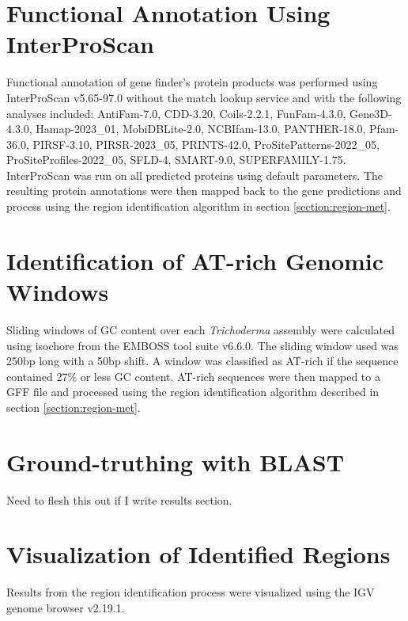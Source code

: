 \section{Functional Annotation Using InterProScan}

Functional annotation of gene finder's protein products was performed
using InterProScan v5.65-97.0\cite{10.1093/bioinformatics/btu031}
without the match lookup service and with the following analyses
included: AntiFam-7.0, CDD-3.20, Coils-2.2.1, FunFam-4.3.0,
Gene3D-4.3.0, Hamap-2023\_01, MobiDBLite-2.0, NCBIfam-13.0,
PANTHER-18.0, Pfam-36.0, PIRSF-3.10, PIRSR-2023\_05, PRINTS-42.0,
ProSitePatterns-2022\_05, ProSiteProfiles-2022\_05, SFLD-4, SMART-9.0,
SUPERFAMILY-1.75. InterProScan was run on all predicted proteins using
default parameters. The resulting protein annotations were then mapped
back to the gene predictions and process using the region
identification algorithm in section \ref{section:region-met}.

\section{Identification of AT-rich Genomic Windows}

Sliding windows of GC content over each \textit{Trichoderma} assembly
were calculated using isochore from the EMBOSS tool suite
v6.6.0\cite{Rice2000}. The sliding window used was 250bp long with a
50bp shift. A window was classified as AT-rich if the sequence
contained 27\% or less GC content. AT-rich sequences were then mapped
to a GFF file and processed using the region identification algorithm
described in section \ref{section:region-met}.

\section{Ground-truthing with BLAST}

Need to flesh this out if I write results section.

\section{Visualization of Identified Regions}

Results from the region identification process were visualized using
the IGV genome browser v2.19.1\cite{Robinson2011}.

